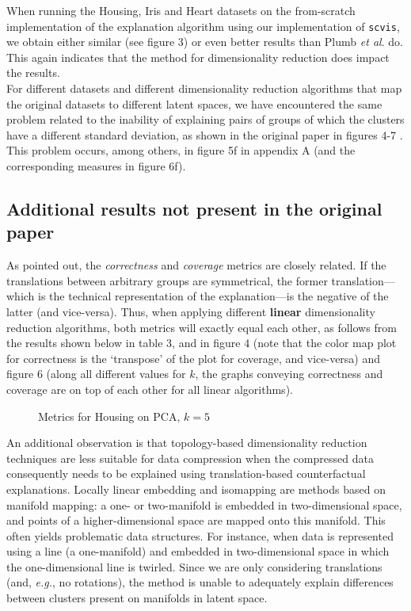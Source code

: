 When running the Housing, Iris and Heart datasets on the from-scratch implementation of the explanation algorithm using our implementation of \texttt{scvis}, we obtain either similar (see figure 3) or even better results than Plumb \textit{et al}. do. This again indicates that the method for dimensionality reduction does impact the results.\\

For different datasets and different dimensionality reduction algorithms that map the original datasets to different latent spaces, we have encountered the same problem related to the inability of explaining pairs of groups of which the clusters have a different standard deviation, as shown in the original paper in figures 4-7 \citep[p.~4]{plumb2020explaining}. This problem occurs, among others, in figure 5f in appendix A (and the corresponding measures in figure 6f).

\subsection{Additional results not present in the original paper}

As \citep[p.~6]{plumb2020explaining} pointed out, the \textit{correctness} and \textit{coverage} metrics are closely related. If the translations between arbitrary groups are symmetrical, the former translation---which is the technical representation of the explanation---is the negative of the latter (and vice-versa). Thus, when applying different \textbf{linear} dimensionality reduction algorithms, both metrics will exactly equal each other, as follows from the results shown below in table 3, and in figure 4 (note that the color map plot for correctness is the `transpose' of the plot for coverage, and vice-versa) and figure 6 (along all different values for $k$, the graphs conveying correctness and coverage are on top of each other for all linear algorithms).\\
\begin{figure}
  \scalebox{0.12}{}
  \caption{Metrics for Housing on PCA, $k = 5$}
\end{figure}

An additional observation is that topology-based dimensionality reduction techniques are less suitable for data compression when the compressed data consequently needs to be explained using translation-based counterfactual explanations. Locally linear embedding and isomapping are methods based on manifold mapping: a one- or two-manifold is embedded in two-dimensional space, and points of a higher-dimensional space are mapped onto this manifold. This often yields problematic data structures. For instance, when data is represented using a line (a one-manifold) and embedded in two-dimensional space in which the one-dimensional line is twirled. Since we are only considering translations (and, \textit{e.g.}, no rotations), the method is unable to adequately explain differences between clusters present on manifolds in latent space.\\

